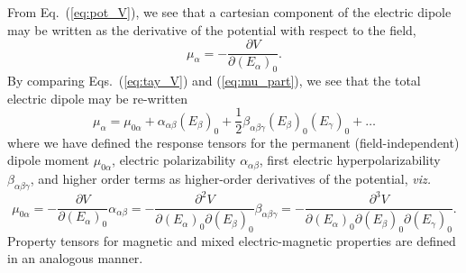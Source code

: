 From Eq.~(\ref{eq:pot_V}), we see that a cartesian component of the electric dipole may be written as the derivative of the potential with respect to the field, 
\begin{equation} \label{eq:mu_part}
    \mu_\alpha = -\frac{\partial V}{\partial (E_\alpha)_0}.
\end{equation}
By comparing Eqs.~(\ref{eq:tay_V}) and (\ref{eq:mu_part}), we see that the total electric dipole may be re-written 
\begin{equation} \label{eq:mu_tot}
\mu_\alpha = \mu_{0\alpha} + \alpha_{\alpha\beta}(E_\beta)_0 + \frac{1}{2}\beta_{\alpha\beta\gamma}(E_\beta)_0(E_\gamma)_0 + \ldots
\end{equation}
where we have defined the response tensors for the permanent (field-independent) dipole moment $\mu_{0\alpha}$, electric polarizability $\alpha_{\alpha\beta}$, first electric hyperpolarizability $\beta_{\alpha\beta\gamma}$, and higher order terms as higher-order derivatives of the potential, \textit{viz.}
\begin{subequations} \label{eq:derivs}
    \begin{equation} \label{eq:mu_0}
    \mu_{0\alpha} = -\frac{\partial V}{\partial (E_\alpha)_0}
    \end{equation}

    \begin{equation} \label{eq:alpha}
    \alpha_{\alpha\beta} = -\frac{\partial^2 V}{\partial (E_\alpha)_0 \partial (E_\beta)_0}
    \end{equation}

    \begin{equation} \label{eq:beta}
    \beta_{\alpha\beta\gamma} = -\frac{\partial^3 V}{\partial (E_\alpha)_0 \partial (E_\beta)_0 \partial (E_\gamma)_0}.
    \end{equation}
\end{subequations}
Property tensors for magnetic and mixed electric-magnetic properties are defined in an analogous manner. 

